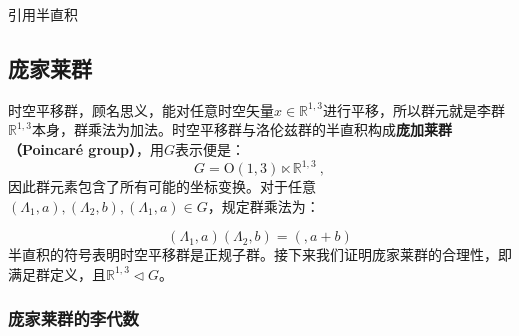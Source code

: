 

\begin{issues}
\issueTODO 引用半直积
\end{issues}


\subsection{庞家莱群}
时空平移群，顾名思义，能对任意时空矢量$x\in \mathbb R^{1,3} $进行平移，所以群元就是李群$\mathbb R^{1,3}$本身，群乘法为加法。时空平移群与洛伦兹群的半直积构成\textbf{庞加莱群（Poincaré group）}，用$G$表示便是：
\begin{equation}
G= \mathrm{O}(1,3) \ltimes\mathbb{R}^{1,3}~,
\end{equation}
因此群元素包含了所有可能的坐标变换。对于任意$(\Lambda_1,a),(\Lambda_2,b),(\Lambda_1,a)\in G$，规定群乘法为：

\begin{equation}
(\Lambda_1,a)(\Lambda_2,b)=(,a+b)
\end{equation}
半直积的符号表明时空平移群是正规子群。接下来我们证明庞家莱群的合理性，即满足群定义，且$\mathbb R^{1,3}\vartriangleleft G$。

\subsubsection{庞家莱群的李代数}